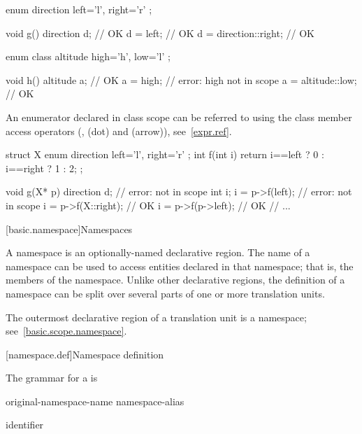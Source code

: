 \begin{codeblock}
enum direction { left='l', right='r' }; 

void g()  { 
  direction d;                  // OK 
  d = left;                     // OK 
  d = direction::right;         // OK 
} 

enum class altitude { high='h', low='l' }; 

void h()  { 
  altitude a;                   // OK 
  a = high;                     // error: high not in scope 
  a = altitude::low;            // OK 
}
\end{codeblock}
\exitexample
{}%
An enumerator declared in class scope can be referred to using the class
member access operators (\tcode{::},  (dot) and \tcode{->}
(arrow)), see~\ref{expr.ref}.
\enterexample

\begin{codeblock}
struct X {
  enum direction { left='l', right='r' };
  int f(int i) { return i==left ? 0 : i==right ? 1 : 2; }
};

void g(X* p) {
  direction d;                  // error:  not in scope
  int i;
  i = p->f(left);               // error:  not in scope
  i = p->f(X::right);           // OK
  i = p->f(p->left);            // OK
  // ...
}
\end{codeblock}
\exitexample

[basic.namespace]{Namespaces}%

\pnum
A namespace is an optionally-named declarative region. The name of a
namespace can be used to access entities declared in that namespace;
that is, the members of the namespace. Unlike other declarative regions,
the definition of a namespace can be split over several parts of one or
more translation units.

\pnum
The outermost declarative region of a translation unit is a namespace;
see~\ref{basic.scope.namespace}.

[namespace.def]{Namespace definition}%
%

\pnum
The grammar for a
is

\begin{bnf}
\br
        original-namespace-name\br
        namespace-alias
\end{bnf}

\begin{bnf}
\br
        identifier
\end{bnf}

